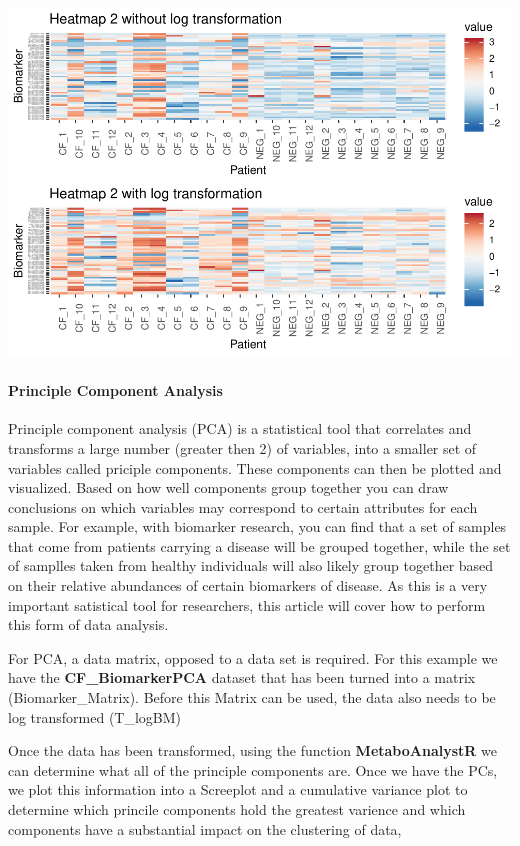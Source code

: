 \documentclass[]{elsarticle} %
\makeatletter
\def\maxwidth{\ifdim\Gin@nat@width>\linewidth\linewidth
\else\Gin@nat@width\fi}
\let\Oldincludegraphics\includegraphics
\renewcommand{\includegraphics}[1]{\Oldincludegraphics[width=\maxwidth]{#1}}
\makeatother
\begin{document}
\includegraphics{06DecFinalDeliverableArticle_files/figure-latex/unnamed-chunk-10-1.pdf}

\hypertarget{principle-component-analysis}{%
\paragraph{Principle Component
Analysis}\label{principle-component-analysis}}

Principle component analysis (PCA) is a statistical tool that correlates
and transforms a large number (greater then 2) of variables, into a
smaller set of variables called priciple components. These components
can then be plotted and visualized. Based on how well components group
together you can draw conclusions on which variables may correspond to
certain attributes for each sample. For example, with biomarker
research, you can find that a set of samples that come from patients
carrying a disease will be grouped together, while the set of samplles
taken from healthy individuals will also likely group together based on
their relative abundances of certain biomarkers of disease. As this is a
very important satistical tool for researchers, this article will cover
how to perform this form of data analysis.

For PCA, a data matrix, opposed to a data set is required. For this
example we have the \textbf{CF\_BiomarkerPCA} dataset that has been
turned into a matrix (Biomarker\_Matrix). Before this Matrix can be
used, the data also needs to be log transformed (T\_logBM)

Once the data has been transformed, using the function
\textbf{MetaboAnalystR} we can determine what all of the principle
components are. Once we have the PCs, we plot this information into a
Screeplot and a cumulative variance plot to determine which princile
components hold the greatest varience and which components have a
substantial impact on the clustering of data,
\end{document}
